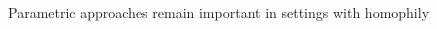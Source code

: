 \documentclass[aspectratio=169]{beamer}
\theoremstyle{remark}
\begin{document}
\begin{frame}{Parametric approaches remain important in settings with homophily}
    \vspace{4mm}
    \begin{columns}
        \begin{column}{0.49\paperwidth}
        \end{column}
        \begin{column}{0.49\paperwidth}
\end{column}
\end{columns}
\end{frame}
\end{document}
